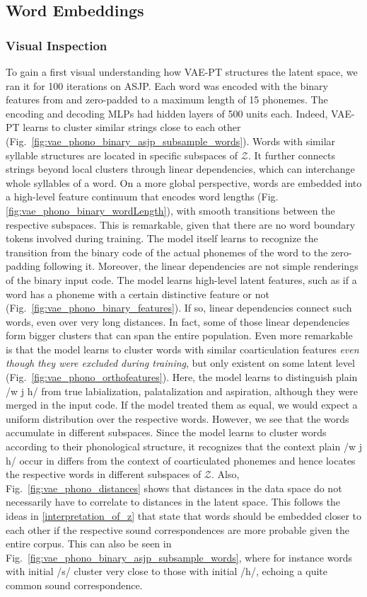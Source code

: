 \documentclass[6pt]{article}
\begin{document}
\subsection{Word Embeddings}
\subsubsection{Visual Inspection}
To gain a first visual understanding how VAE-PT structures the latent space, we ran it for 100 iterations on ASJP. Each word was encoded with the binary features from \cite{rama2016siamese} and zero-padded to a maximum length of 15 phonemes. The encoding and decoding MLPs had hidden layers of 500 units each.
Indeed, VAE-PT learns to cluster similar strings close to each other (Fig.~\ref{fig:vae_phono_binary_asjp_subsample_words}). Words with similar syllable structures are located in specific subspaces of $\mathcal{Z}$. It further connects strings beyond local clusters through linear dependencies, which can interchange whole syllables of a word. 
On a more global perspective, words are embedded into a high-level feature continuum that encodes word lengths (Fig. \ref{fig:vae_phono_binary_wordLength}), with smooth transitions between the respective subspaces. This is remarkable, given that there are no word boundary tokens involved during training. The model itself learns to recognize the transition from the binary code of the actual phonemes of the word to the zero-padding following it.
Moreover, the linear dependencies are not simple renderings of the binary input code. The model learns high-level latent features, such as if a word has a phoneme with a certain distinctive feature or not (Fig.~\ref{fig:vae_phono_binary_features}). If so, linear dependencies connect such words, even over very long distances. In fact, some of those linear dependencies form bigger clusters that can span the entire population. 
Even more remarkable is that the model learns to cluster words with similar coarticulation features \textit{even though they were excluded during training}, but only existent on some latent level (Fig.~\ref{fig:vae_phono_orthofeatures}). Here, the model learns to distinguish plain /w j h/ from true labialization, palatalization and aspiration, although they were merged in the input code. If the model treated them as equal, we would expect a uniform distribution over the respective words. However, we see that the words accumulate in different subspaces. Since the model learns to cluster words according to their phonological structure, it recognizes that the context plain /w j h/ occur in differs from the context of coarticulated phonemes and hence locates the respective words in different subspaces of $\mathcal{Z}$. Also, Fig.~\ref{fig:vae_phono_distances} shows that distances in the data space do not necessarily have to correlate to distances in the latent space. This follows the ideas in \ref{interpretation_of_z} that state that words should be embedded closer to each other if the respective sound correspondences are more probable given the entire corpus. This can also be seen in Fig.~\ref{fig:vae_phono_binary_asjp_subsample_words}, where for instance words with initial /s/ cluster very close to those with initial /h/, echoing a quite common sound correspondence.
\end{document}
